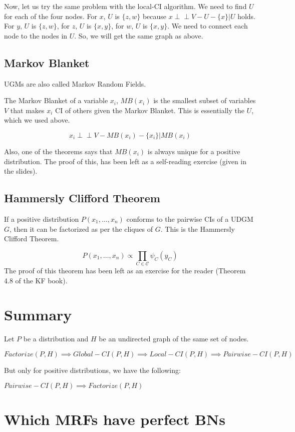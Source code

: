\documentclass[a4paper]{article}
\begin{document}
Now, let us try the same problem with the local-CI algorithm. We need to find $U$ for each of the four nodes. For $x$, $U$ is $\{z, w\}$ because $x \perp\!\!\!\perp V - U - \{x\} | U$ holds. For $y$, $U$ is $\{z, w\}$, for $z$, $U$ is $\{x, y\}$, for $w$, $U$ is $\{x, y\}$. We need to connect each node to the nodes in $U$. So, we will get the same graph as above.

\subsection{Markov Blanket}
UGMs are also called Markov Random Fields. 

The Markov Blanket of a variable $x_i$, $MB(x_i)$ is the smallest subset of variables $V$ that makes $x_i$ CI of others given the Markov Blanket. This is essentially the $U$, which we used above. 

\[x_i \perp\!\!\!\perp V - MB(x_i) - \{x_i\} | MB(x_i) \]


Also, one of the theorems says that $MB(x_i)$ is always unique for a positive distribution. The proof of this, has been left as a self-reading exercise (given in the slides).

\subsection{Hammersly Clifford Theorem}
If a positive distribution $P(x_1, \dots, x_n)$ conforms to the pairwise CIs of a UDGM $G$, then it can be factorized as per the cliques of $G$. This is the Hammersly Clifford Theorem. 

\[
P(x_1, \dots, x_n) \propto \prod_{C \in \mathcal{C}} \psi_C(y_C)
\]
The proof of this theorem has been left as an exercise for the reader (Theorem 4.8 of the KF book).


\section{Summary}
Let $P$ be a distribution and $H$ be an undirected graph of the same set of nodes. 

$Factorize(P, H) \implies Global-CI(P, H) \implies Local-CI(P, H) \implies Pairwise-CI(P, H)$

But only for positive distributions, we have the following:

$Pairwise-CI(P, H) \implies Factorize(P, H)$




\section{Which MRFs have perfect BNs}
\end{document}

